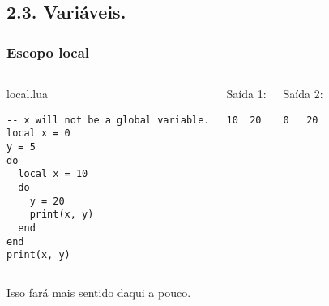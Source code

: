 \documentclass[brazil]{beamer}
\begin{document}
\subsection{2.3. Variáveis.}



\begin{frame}[fragile]
  \frametitle{Escopo local}
  \pause
  \begin{columns}
      \begin{block}{local.lua}
        \begin{lstlisting}
-- x will not be a global variable.
local x = 0
y = 5
do
  local x = 10
  do
    y = 20
    print(x, y)
  end
end
print(x, y)
        \end{lstlisting}
      \end{block}
    \pause
      \begin{block}{Saída 1:}
        \begin{verbatim}
10  20\end{verbatim}
      \end{block}
      \pause
      \begin{block}{Saída 2:}
        \begin{verbatim}
0   20\end{verbatim}
      \end{block}
  \end{columns}
  \pause
  \begin{center}
    Isso fará mais sentido daqui a pouco.
  \end{center}
\end{frame}
\end{document}
